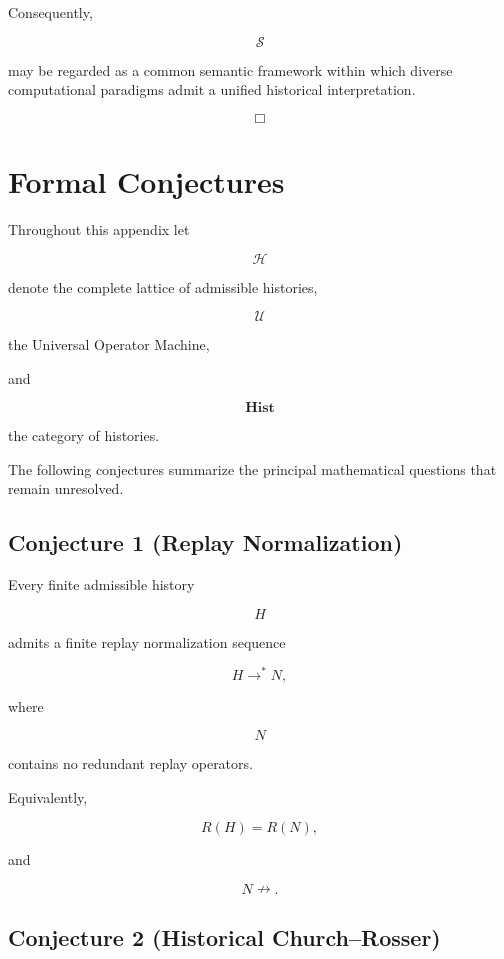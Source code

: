\documentclass[12pt,oneside]{article}
\theoremstyle{definition}
\theoremstyle{remark}
\begin{document}
Consequently,

\[
\mathcal S
\]

may be regarded as a common semantic framework within which diverse computational paradigms admit a unified historical interpretation.

\[
\Box
\]

\section{Formal Conjectures}

Throughout this appendix let

\[
\mathcal H
\]

denote the complete lattice of admissible histories,

\[
\mathcal U
\]

the Universal Operator Machine,

and

\[
\mathbf{Hist}
\]

the category of histories.

The following conjectures summarize the principal mathematical questions that
remain unresolved.

\subsection*{Conjecture 1 (Replay Normalization)}

Every finite admissible history

\[
H
\]

admits a finite replay normalization sequence

\[
H
\longrightarrow^{*}
N,
\]

where

\[
N
\]

contains no redundant replay operators.

Equivalently,

\[
R(H)
=
R(N),
\]

and

\[
N
\nrightarrow.
\]

\subsection*{Conjecture 2 (Historical Church--Rosser)}
\end{document}
